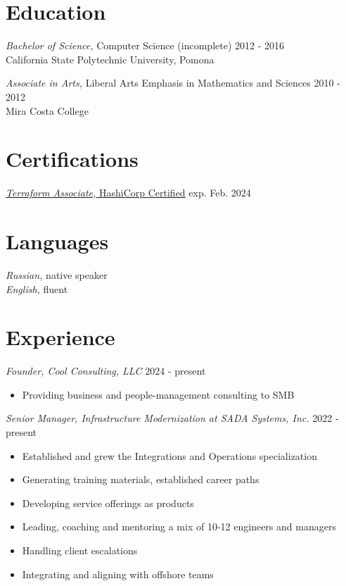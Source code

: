 \documentclass[line]{docs/resume/res}
\begin{document}
\address{https://slava.lol}
\address{C: +1-858-523-8059}
\address{E: jobs@slava.lol}
\address{L: Port Orchard, WA, USA}

\begin{resume}

\section{Education}
  {\sl Bachelor of Science,} Computer Science (incomplete) \hfill 2012 - 2016 \\
  California State Polytechnic University, Pomona

  {\sl Associate in Arts,} Liberal Arts Emphasis in Mathematics and Sciences \hfill 2010 - 2012 \\
  Mira Costa College

\section{Certifications}
  \href{https://www.credly.com/earner/earned/badge/7b236fee-2866-4ca1-9da4-7600f851212c}{{\sl Terraform Associate,} HashiCorp Certified} \hfill exp. Feb. 2024

\section{Languages}
  {\sl Russian,} native speaker \\
  {\sl English,} fluent

\section{Experience}
  {\sl Founder, Cool Consulting, LLC} \hfill 2024 - present
  \begin{itemize} \itemsep -2pt
    \item Providing business and people-management consulting to SMB
  \end{itemize}

  {\sl Senior Manager, Infrastructure Modernization at SADA Systems, Inc.} \hfill 2022 - present
  \begin{itemize} \itemsep -2pt
    \item Established and grew the Integrations and Operations specialization
    \item Generating training materials, established career paths
    \item Developing service offerings as products
    \item Leading, coaching and mentoring a mix of 10-12 engineers and managers
    \item Handling client escalations
    \item Integrating and aligning with offshore teams
  \end{itemize}


\end{resume}
\end{document}
